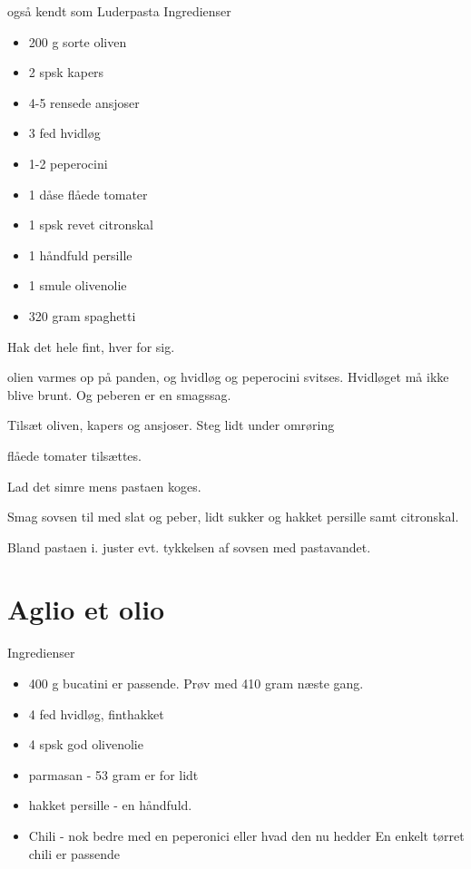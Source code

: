 \documentclass[
]{book}
\providecommand{\tightlist}{%
  \setlength{\itemsep}{0pt}\setlength{\parskip}{0pt}}
\begin{document}
også kendt som Luderpasta
Ingredienser

\begin{itemize}
\tightlist
\item
  200 g sorte oliven
\item
  2 spsk kapers
\item
  4-5 rensede ansjoser
\item
  3 fed hvidløg
\item
  1-2 peperocini
\item
  1 dåse flåede tomater
\item
  1 spsk revet citronskal
\item
  1 håndfuld persille
\item
  1 smule olivenolie
\item
  320 gram spaghetti
\end{itemize}

Hak det hele fint, hver for sig.

olien varmes op på panden, og hvidløg og peperocini svitses. Hvidløget må ikke blive brunt. Og peberen er en smagssag.

Tilsæt oliven, kapers og ansjoser. Steg lidt under omrøring

flåede tomater tilsættes.

Lad det simre mens pastaen koges.

Smag sovsen til med slat og peber, lidt sukker og hakket persille samt citronskal.

Bland pastaen i. juster evt. tykkelsen af sovsen med pastavandet.

\hypertarget{aglio-et-olio}{%
\section{Aglio et olio}\label{aglio-et-olio}}

Ingredienser

\begin{itemize}
\tightlist
\item
  400 g bucatini er passende. Prøv med 410 gram næste gang.
\item
  4 fed hvidløg, finthakket
\item
  4 spsk god olivenolie
\item
  parmasan - 53 gram er for lidt
\item
  hakket persille - en håndfuld.
\item
  Chili - nok bedre med en peperonici eller hvad den nu hedder En enkelt tørret chili er passende
\end{itemize}
\end{document}
